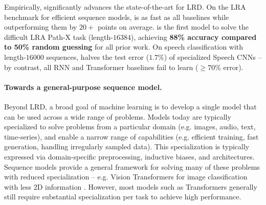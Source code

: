 Empirically, \methodabbrv{} significantly advances the state-of-the-art for LRD.
On the LRA benchmark for efficient sequence models, \methodabbrv{} is as fast as all baselines while outperforming them by $20+$ points on average.
\methodabbrv{} is the first model to solve the difficult LRA Path-X task (length-$16384$), achieving \textbf{88\% accuracy compared to 50\% random guessing} for all prior work.
On speech classification with length-$16000$ sequences, \methodabbrv{} halves the test error ($1.7\%$) of specialized Speech CNNs --
by contrast, all RNN and Transformer baselines fail to learn ($\ge 70\%$ error).



\paragraph{Towards a general-purpose sequence model.}
Beyond LRD, a broad goal of machine learning is to develop a single model that can be used across a wide range of problems.
Models today are typically specialized to solve problems from a particular domain (e.g. images, audio, text, time-series), and enable a narrow range of capabilities (e.g. efficient training, fast generation, handling irregularly sampled data).
This specialization is typically expressed via domain-specific preprocessing, inductive biases, and architectures. %
Sequence models provide a general framework for solving many of these problems with reduced specialization
-- e.g. Vision Transformers for image classification with less 2D information \citep{dosovitskiy2020image}. %
However, most models such as Transformers generally still require substantial specialization per task to achieve high performance.





